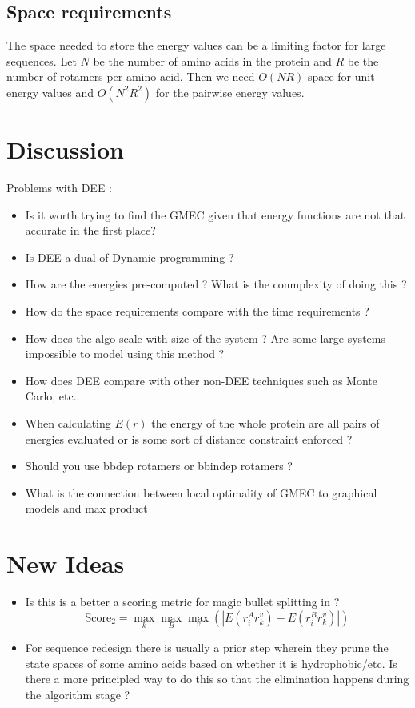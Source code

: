 \documentclass{article}
\begin{document}
\subsection{Space requirements}
The space needed to store the energy values can be a limiting factor for large sequences. Let $N$ be the number of amino acids in the protein and $R$ be the number of rotamers per amino acid. Then we need $O(NR)$ space for unit energy values and $O(N^2R^2)$ for the pairwise energy values. 

\section{Discussion}

Problems with DEE :
\begin{itemize}
\item Is it worth trying to find the GMEC given that energy functions are not that accurate in the first place?
\item Is DEE a dual of Dynamic programming ? 
\item How are the energies pre-computed ? What is the conmplexity of doing this ?
\item How do the space requirements compare with the time requirements ?
\item How does the algo scale with size of the system ? Are some large systems impossible to model using this method ? 
\item How does DEE compare with other non-DEE techniques such as Monte Carlo, etc..
\item When calculating $E(r)$ the energy of the whole protein are all pairs of energies evaluated or is some sort of distance constraint enforced ?
\item Should you use bbdep rotamers or bbindep rotamers ?
\item What is the connection between local optimality of GMEC to graphical models and max product
\end{itemize}

\section{New Ideas}

\begin{itemize}
\item Is this is a better a scoring metric for magic bullet splitting in  \cite{Pierce2000} ? 
\[
\text{Score}_2 = \max_k \max_B \max_v \left( \left| E(r_i^Ar_k^v) - E(r_i^Br_k^v) \right| \right)
\]
\item For sequence redesign there is usually a prior step wherein they prune the state spaces of some amino acids based on whether it is hydrophobic/etc. Is there a more principled way to do this so that the elimination happens during the algorithm stage ?
\end{itemize}
\end{document}
